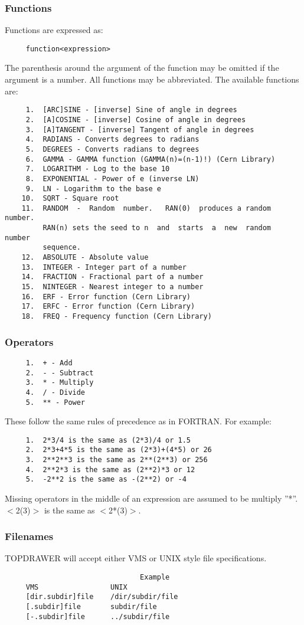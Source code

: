 \subsubsection{Functions}
Functions are expressed as:  
\begin{verbatim}
     function<expression> 
\end{verbatim}
The  parenthesis  around the argument of the function may be omitted if
the argument is a number.   All  functions  may  be  abbreviated.   The
available functions are:  
\begin{verbatim}
     1.  [ARC]SINE - [inverse] Sine of angle in degrees 
     2.  [A]COSINE - [inverse] Cosine of angle in degrees 
     3.  [A]TANGENT - [inverse] Tangent of angle in degrees 
     4.  RADIANS - Converts degrees to radians 
     5.  DEGREES - Converts radians to degrees 
     6.  GAMMA - GAMMA function (GAMMA(n)=(n-1)!) (Cern Library) 
     7.  LOGARITHM - Log to the base 10 
     8.  EXPONENTIAL - Power of e (inverse LN) 
     9.  LN - Logarithm to the base e 
    10.  SQRT - Square root 
    11.  RANDOM  -  Random  number.   RAN(0)  produces a random number.
         RAN(n) sets the seed to n  and  starts  a  new  random  number
         sequence.  
    12.  ABSOLUTE - Absolute value 
    13.  INTEGER - Integer part of a number 
    14.  FRACTION - Fractional part of a number 
    15.  NINTEGER - Nearest integer to a number 
    16.  ERF - Error function (Cern Library) 
    17.  ERFC - Error function (Cern Library) 
    18.  FREQ - Frequency function (Cern Library) 
\end{verbatim}
\subsubsection{Operators}
\begin{verbatim}
     1.  + - Add 
     2.  - - Subtract 
     3.  * - Multiply 
     4.  / - Divide 
     5.  ** - Power 
\end{verbatim}
These follow the same rules of precedence as in FORTRAN.  For example: 
\begin{verbatim}
     1.  2*3/4 is the same as (2*3)/4 or 1.5 
     2.  2*3+4*5 is the same as (2*3)+(4*5) or 26 
     3.  2**2**3 is the same as 2**(2**3) or 256 
     4.  2**2*3 is the same as (2**2)*3 or 12 
     5.  -2**2 is the same as -(2**2) or -4 
\end{verbatim}
Missing  operators  in  the  middle  of an expression are assumed to be
multiply ''*''.  $<$2(3)$>$ is the same as $<$2*(3)$>$.  
\subsubsection{Filenames}
TOPDRAWER will accept either VMS or UNIX style file specifications.  
\begin{verbatim}
                                Example
     VMS                 UNIX
     [dir.subdir]file    /dir/subdir/file
     [.subdir]file       subdir/file
     [-.subdir]file      ../subdir/file
\end{verbatim}
